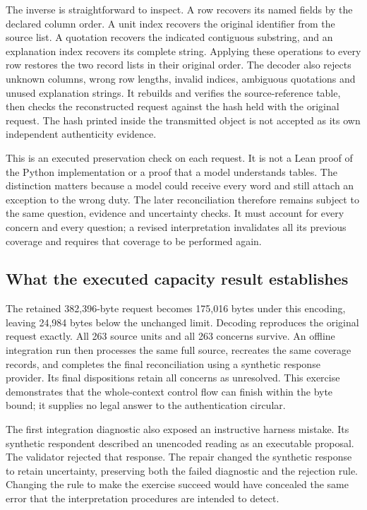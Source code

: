 The inverse is straightforward to inspect. A row recovers its named fields by
the declared column order. A unit index recovers the original identifier from
the source list. A quotation recovers the indicated contiguous substring, and
an explanation index recovers its complete string. Applying these operations to
every row restores the two record lists in their original order. The decoder
also rejects unknown columns, wrong row lengths, invalid indices, ambiguous
quotations and unused explanation strings. It rebuilds and verifies the
source-reference table, then checks the reconstructed request against the hash
held with the original request. The hash printed inside the transmitted object
is not accepted as its own independent authenticity evidence.

This is an executed preservation check on each request. It is not a Lean proof
of the Python implementation or a proof that a model understands tables. The
distinction matters because a model could receive every word and still attach
an exception to the wrong duty. The later reconciliation therefore remains
subject to the same question, evidence and uncertainty checks. It must account
for every concern and every question; a revised interpretation invalidates all
its previous coverage and requires that coverage to be performed again.

\subsection{What the executed capacity result establishes}

The retained 382,396-byte request becomes 175,016 bytes under this encoding,
leaving 24,984 bytes below the unchanged limit. Decoding reproduces the original
request exactly. All 263 source units and all 263 concerns survive. An offline
integration run then processes the same full source, recreates the same coverage
records, and completes the final reconciliation using a synthetic response
provider. Its final dispositions retain all concerns as unresolved. This
exercise demonstrates that the whole-context control flow can finish within
the byte bound; it supplies no legal answer to the authentication circular.

The first integration diagnostic also exposed an instructive harness mistake.
Its synthetic respondent described an unencoded reading as an executable
proposal. The validator rejected that response. The repair changed the
synthetic response to retain uncertainty, preserving both the failed diagnostic
and the rejection rule. Changing the rule to make the exercise succeed would
have concealed the same error that the interpretation procedures are intended
to detect.

